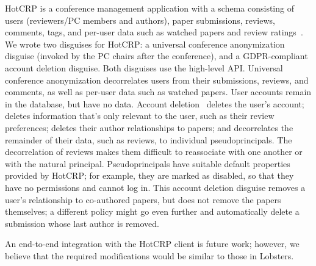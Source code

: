 %
HotCRP is a conference management application with a schema consisting of users
(reviewers/PC members and authors), paper submissions, reviews, comments, tags,
and per-user data such as watched papers and review ratings~\cite{hotcrp}.
%
We wrote two disguises for HotCRP: a universal conference anonymization disguise
(invoked by the PC chairs after the conference), and a GDPR-compliant account
deletion disguise.
%
Both disguises use the high-level \sys API.
%
%
Universal conference anonymization decorrelates users from their submissions,
reviews, and comments, as well as per-user data such as watched papers.
%
User accounts remain in the database, but have no data.
%
Account deletion \one{} deletes the user's account; \two{} deletes information
that's only relevant to the user, such as their review preferences;
\three{} deletes their author relationships to papers; and
\four{} decorrelates the remainder of their data, such as reviews, to
individual pseudoprincipals.
%
The decorrelation of reviews makes them difficult to reassociate with one
another or with the natural principal.
%
Pseudoprincipals have suitable default properties provided by HotCRP; for example,
they are marked as disabled, so that they have no permissions and cannot log in.
%
This account deletion disguise removes a user's relationship to co-authored papers,
but does not remove the papers themselves; a different policy might go even
further and automatically delete a submission whose last author is removed.
%

An end-to-end integration with the HotCRP client is future work; however, we believe
that the required modifications would be similar to those in Lobsters.
